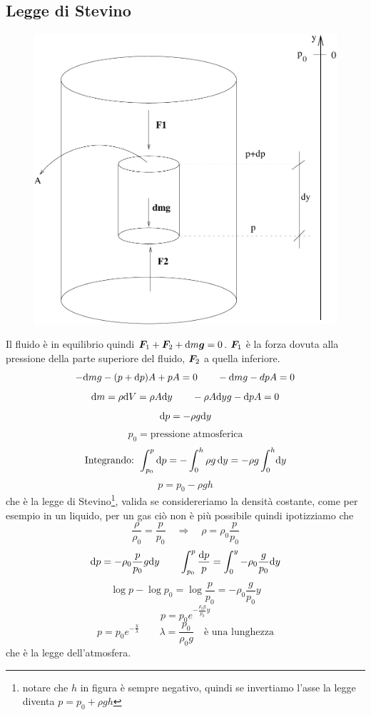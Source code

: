 \subsection{Legge di Stevino}
\label{stevino11}
\begin{figure}[htbp]
\centering
\includegraphics[scale=0.4]{immagini/fisica1/legge_di_stevino1}
\end{figure}


Il fluido è in equilibrio quindi $\boldsymbol{F}_1+\boldsymbol{F}_2+\mathrm{d} m\boldsymbol{g}=0$. $\boldsymbol{F}_1$ è la forza dovuta alla pressione della parte superiore del fluido, $\boldsymbol{F}_2$ a quella inferiore.
$$-\mathrm{d} mg-(p+\mathrm{d} p)A+pA=0\qquad -\mathrm{d} mg-dpA=0$$
$$\mathrm{d} m=\rho \mathrm{d} V=\rho A\mathrm{d} y\qquad -\rho A\mathrm{d} y g-\mathrm{d} p A=0$$
$$\mathrm{d} p=-\rho g \mathrm{d} y$$
$$p_0=\text{pressione atmosferica}$$
$$\text{Integrando: }\int_{p_0}^p \mathrm{d} p=-\int_0^h \rho g\,\mathrm{d} y=-\rho g\int_0^h\!\mathrm{d} y$$
$$p=p_0-\rho g h$$
che è la legge di Stevino\footnote{notare che $h$ in figura è sempre negativo, quindi se invertiamo l'asse la legge diventa $p=p_0+\rho gh$}, valida se considereriamo la densità costante, come per esempio in un liquido, per un gas ciò non è più possibile quindi ipotizziamo che $$\frac{\rho}{\rho_0}=\frac{p}{p_0}\quad\Rightarrow\quad \rho=\rho_0\frac{p}{p_0}$$
$$\mathrm{d} p=-\rho_0\frac{p}{p_0}g\mathrm{d} y\qquad \int_{p_0}^p \frac{\mathrm{d} p}{p}=\int_0^y -\rho_0\frac{g}{p_0}\mathrm{d} y$$
$$\log p-\log p_0=\log\frac{p}{p_0}=-\rho_0\frac{g}{p_0}y$$
\begin{equation}
p=p_0e^{-\frac{\rho_0 g}{p_0}y}
\label{legge_atmosfera}
\end{equation}
$$p=p_0e^{-\frac{y}{\lambda}}\qquad \lambda=\frac{p_0}{\rho_0 g}\quad \text{è una lunghezza}$$
che è la legge dell'atmosfera.

